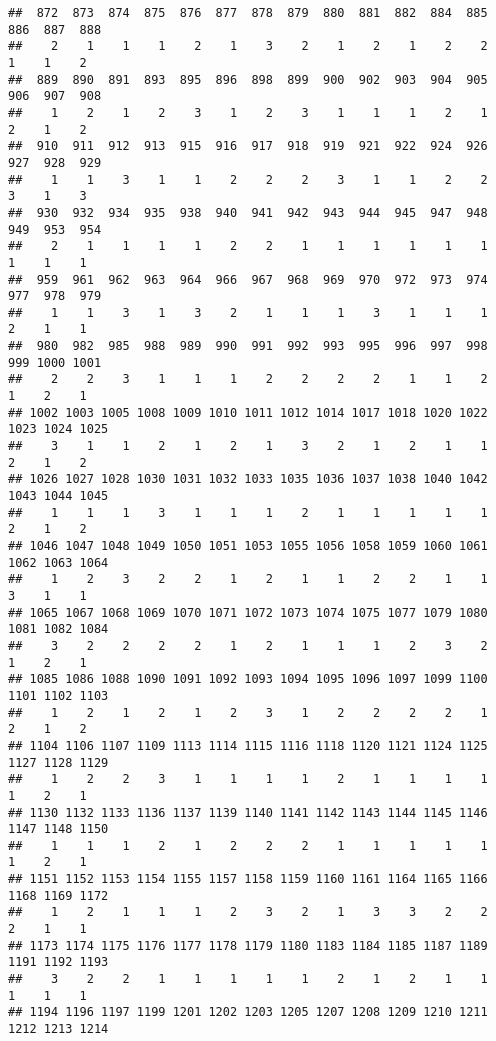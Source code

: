 \documentclass[
]{article}
\begin{document}
\begin{verbatim}
##  872  873  874  875  876  877  878  879  880  881  882  884  885  886  887  888 
##    2    1    1    1    2    1    3    2    1    2    1    2    2    1    1    2 
##  889  890  891  893  895  896  898  899  900  902  903  904  905  906  907  908 
##    1    2    1    2    3    1    2    3    1    1    1    2    1    2    1    2 
##  910  911  912  913  915  916  917  918  919  921  922  924  926  927  928  929 
##    1    1    3    1    1    2    2    2    3    1    1    2    2    3    1    3 
##  930  932  934  935  938  940  941  942  943  944  945  947  948  949  953  954 
##    2    1    1    1    1    2    2    1    1    1    1    1    1    1    1    1 
##  959  961  962  963  964  966  967  968  969  970  972  973  974  977  978  979 
##    1    1    3    1    3    2    1    1    1    3    1    1    1    2    1    1 
##  980  982  985  988  989  990  991  992  993  995  996  997  998  999 1000 1001 
##    2    2    3    1    1    1    2    2    2    2    1    1    2    1    2    1 
## 1002 1003 1005 1008 1009 1010 1011 1012 1014 1017 1018 1020 1022 1023 1024 1025 
##    3    1    1    2    1    2    1    3    2    1    2    1    1    2    1    2 
## 1026 1027 1028 1030 1031 1032 1033 1035 1036 1037 1038 1040 1042 1043 1044 1045 
##    1    1    1    3    1    1    1    2    1    1    1    1    1    2    1    2 
## 1046 1047 1048 1049 1050 1051 1053 1055 1056 1058 1059 1060 1061 1062 1063 1064 
##    1    2    3    2    2    1    2    1    1    2    2    1    1    3    1    1 
## 1065 1067 1068 1069 1070 1071 1072 1073 1074 1075 1077 1079 1080 1081 1082 1084 
##    3    2    2    2    2    1    2    1    1    1    2    3    2    1    2    1 
## 1085 1086 1088 1090 1091 1092 1093 1094 1095 1096 1097 1099 1100 1101 1102 1103 
##    1    2    1    2    1    2    3    1    2    2    2    2    1    2    1    2 
## 1104 1106 1107 1109 1113 1114 1115 1116 1118 1120 1121 1124 1125 1127 1128 1129 
##    1    2    2    3    1    1    1    1    2    1    1    1    1    1    2    1 
## 1130 1132 1133 1136 1137 1139 1140 1141 1142 1143 1144 1145 1146 1147 1148 1150 
##    1    1    1    2    1    2    2    2    1    1    1    1    1    1    2    1 
## 1151 1152 1153 1154 1155 1157 1158 1159 1160 1161 1164 1165 1166 1168 1169 1172 
##    1    2    1    1    1    2    3    2    1    3    3    2    2    2    1    1 
## 1173 1174 1175 1176 1177 1178 1179 1180 1183 1184 1185 1187 1189 1191 1192 1193 
##    3    2    2    1    1    1    1    1    2    1    2    1    1    1    1    1 
## 1194 1196 1197 1199 1201 1202 1203 1205 1207 1208 1209 1210 1211 1212 1213 1214 

\end{verbatim}
\end{document}
